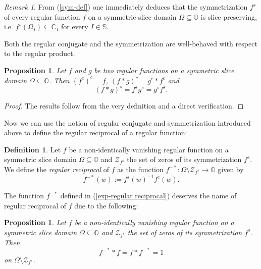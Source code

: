 \documentclass{amsart}
\newtheorem{proposition}[theorem]{Proposition}
\theoremstyle{definition}
\newtheorem{definition}[theorem]{Definition}
\theoremstyle{remark}
\newtheorem{remark}[theorem]{Remark}
\numberwithin{equation}{section}
\begin{document}
\begin{remark}\label{remark on con-sym02}
From (\ref{sym-def}) one immediately deduces that the  symmetrization $f^s$ of every regular function $f$ on a symmetric slice domain  $\Omega\subseteq \mathbb O$ is slice preserving, i.e. $f^s(\Omega_I)\subseteq \mathbb C_I$ for every $I\in\mathbb S$.
\end{remark}

Both the regular conjugate and  the symmetrization are well-behaved with respect to the  regular product.

\begin{proposition}\label{beh-con-sym}
Let $f$ and $g$ be two regular functions on  a symmetric slice domain $\Omega\subseteq \mathbb O$. Then $(f^c)^c=f$, $(f\ast g)^c=g^c\ast f^c$ and
$$(f\ast g)^s=f^sg^s=g^sf^s.$$
\end{proposition}

\begin{proof}
The results follow from the very definition and a direct verification.
\end{proof}

Now we can use the notion of regular conjugate and symmetrization introduced above to define the regular reciprocal of a regular function:

\begin{definition}\label{def-regular reciprocal}
Let $f$  be a non-identically vanishing  regular function on  a symmetric slice domain $\Omega\subseteq \mathbb O$ and $\mathcal{Z}_{f^s}$   the set of zeros of its symmetrization $f^s$. We define the \textit{regular reciprocal} of $f$ as the function $f^{-\ast}:\Omega\setminus \mathcal{Z}_{f^s}\rightarrow \mathbb O$ given by
\begin{equation}\label{exp-regular reciprocal}
f^{-\ast}(w):=f^s(w)^{-1}f^c(w).
\end{equation}
\end{definition}

The function $f^{-\ast}$ defined in (\ref{exp-regular reciprocal}) deserves the name of regular reciprocal of $f$ due to the following:

\begin{proposition}
Let $f$  be a  non-identically vanishing regular function on  a symmetric slice domain $\Omega\subseteq \mathbb O$ and $\mathcal{Z}_{f^s}$   the set of zeros of its symmetrization $f^s$. Then
$$f^{-\ast}\ast f=f\ast f^{-\ast}=1$$
on $\Omega\setminus \mathcal{Z}_{f^s}$.
\end{proposition}
\end{document}
